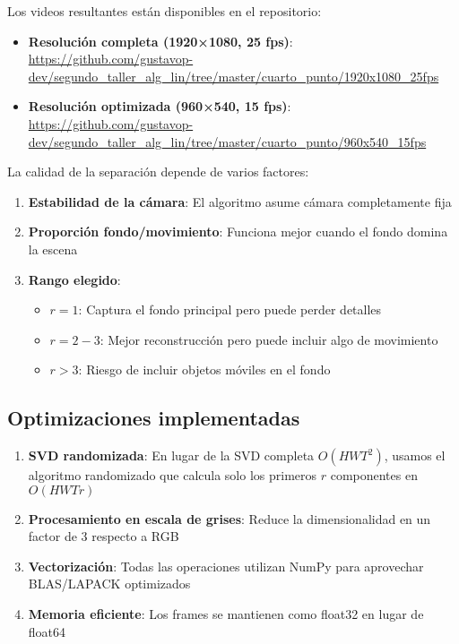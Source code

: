 \documentclass[12pt]{article}
\begin{document}
Los videos resultantes están disponibles en el repositorio:
\begin{itemize}
    \item \textbf{Resolución completa (1920×1080, 25 fps)}: \url{https://github.com/gustavop-dev/segundo_taller_alg_lin/tree/master/cuarto_punto/1920x1080_25fps}
    \item \textbf{Resolución optimizada (960×540, 15 fps)}: \url{https://github.com/gustavop-dev/segundo_taller_alg_lin/tree/master/cuarto_punto/960x540_15fps}
\end{itemize}

La calidad de la separación depende de varios factores:

\begin{enumerate}
    \item \textbf{Estabilidad de la cámara}: El algoritmo asume cámara completamente fija
    \item \textbf{Proporción fondo/movimiento}: Funciona mejor cuando el fondo domina la escena
    \item \textbf{Rango elegido}: 
    \begin{itemize}
        \item $r=1$: Captura el fondo principal pero puede perder detalles
        \item $r=2-3$: Mejor reconstrucción pero puede incluir algo de movimiento
        \item $r>3$: Riesgo de incluir objetos móviles en el fondo
    \end{itemize}
\end{enumerate}

\subsection{Optimizaciones implementadas}

\begin{enumerate}
    \item \textbf{SVD randomizada}: En lugar de la SVD completa $O(HWT^2)$, usamos el algoritmo randomizado que calcula solo los primeros $r$ componentes en $O(HWTr)$
    
    \item \textbf{Procesamiento en escala de grises}: Reduce la dimensionalidad en un factor de 3 respecto a RGB
    
    \item \textbf{Vectorización}: Todas las operaciones utilizan NumPy para aprovechar BLAS/LAPACK optimizados
    
    \item \textbf{Memoria eficiente}: Los frames se mantienen como float32 en lugar de float64
\end{enumerate}
\end{document}
